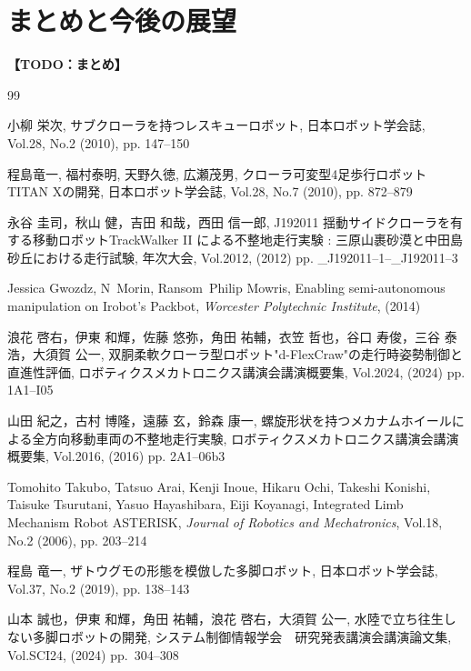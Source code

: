 \documentclass[uplatex,dvipdfmx]{jsarticle}
\newcommand{\todo}[1]{\textbf{【TODO：#1】}}
\begin{document}
\section{まとめと今後の展望}
\todo{まとめ}

\begin{thebibliography}{99}

小柳 栄次, サブクローラを持つレスキューロボット, 日本ロボット学会誌, Vol.28, No.2 (2010), pp. 147--150

程島竜一, 福村泰明, 天野久徳, 広瀬茂男, クローラ可変型4足歩行ロボットTITAN Xの開発, 日本ロボット学会誌, Vol.28, No.7 (2010), pp. 872--879

永谷 圭司，秋山 健，吉田 和哉，西田 信一郎, J192011 揺動サイドクローラを有する移動ロボットTrackWalker II による不整地走行実験 : 三原山裹砂漠と中田島砂丘における走行試験, 年次大会, Vol.2012, (2012) pp. \_J192011--1--\_J192011--3

Jessica Gwozdz, N~Morin, Ransom~Philip Mowris, Enabling semi-autonomous manipulation on Irobot's Packbot, {\em Worcester Polytechnic Institute}, (2014)

浪花 啓右，伊東 和輝，佐藤 悠弥，角田 祐輔，衣笠 哲也，谷口 寿俊，三谷 泰浩，大須賀 公一, 双胴柔軟クローラ型ロボット"d-FlexCraw"の走行時姿勢制御と直進性評価, ロボティクスメカトロニクス講演会講演概要集, Vol.2024, (2024) pp. 1A1--I05

山田 紀之，古村 博隆，遠藤 玄，鈴森 康一, 螺旋形状を持つメカナムホイールによる全方向移動車両の不整地走行実験, ロボティクスメカトロニクス講演会講演概要集, Vol.2016, (2016) pp. 2A1--06b3

Tomohito Takubo, Tatsuo Arai, Kenji Inoue, Hikaru Ochi, Takeshi Konishi, Taisuke Tsurutani, Yasuo Hayashibara, Eiji Koyanagi, Integrated Limb Mechanism Robot ASTERISK, {\em Journal of Robotics and Mechatronics}, Vol.18, No.2 (2006), pp. 203--214

程島 竜一, ザトウグモの形態を模倣した多脚ロボット, 日本ロボット学会誌, Vol.37, No.2 (2019), pp. 138--143

山本 誠也，伊東 和輝，角田 祐輔，浪花 啓右，大須賀 公一, 水陸で立ち往生しない多脚ロボットの開発, システム制御情報学会　研究発表講演会講演論文集, Vol.SCI24, (2024) pp.~304--308


\end{thebibliography}
\end{document}
